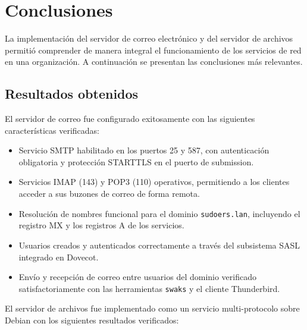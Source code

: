 
\section{Conclusiones}

La implementación del servidor de correo electrónico y del servidor de
archivos permitió comprender de manera integral el funcionamiento de los
servicios de red en una organización. A continuación se presentan las
conclusiones más relevantes.

\subsection{Resultados obtenidos}

El servidor de correo fue configurado exitosamente con las siguientes
características verificadas:

\begin{itemize}
  \item Servicio SMTP habilitado en los puertos 25 y 587, con autenticación
        obligatoria y protección STARTTLS en el puerto de submission.
  \item Servicios IMAP (143) y POP3 (110) operativos, permitiendo a los
        clientes acceder a sus buzones de correo de forma remota.
  \item Resolución de nombres funcional para el dominio \texttt{sudoers.lan},
        incluyendo el registro MX y los registros A de los servicios.
  \item Usuarios creados y autenticados correctamente a través del subsistema
        SASL integrado en Dovecot.
  \item Envío y recepción de correo entre usuarios del dominio verificado
        satisfactoriamente con las herramientas \texttt{swaks} y el cliente
        Thunderbird.
\end{itemize}

El servidor de archivos fue implementado como un servicio multi-protocolo
sobre Debian con los siguientes resultados verificados:

